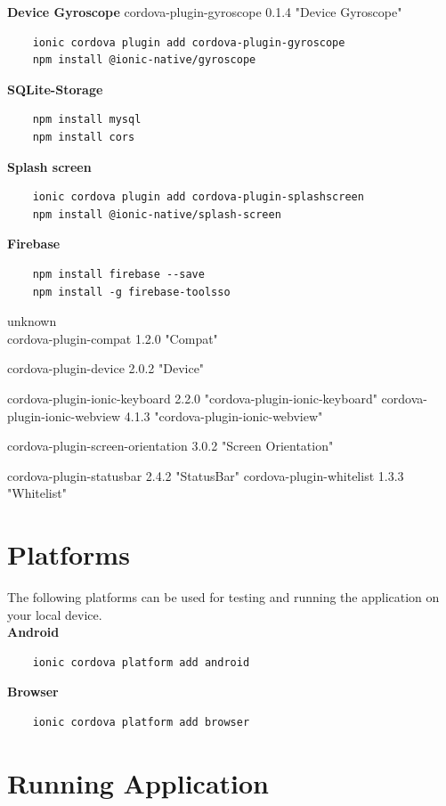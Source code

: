 \documentclass[a4paper,12pt]{report}
\begin{document}
\textbf{Device Gyroscope} cordova-plugin-gyroscope 0.1.4 "Device Gyroscope"
\begin{lstlisting}
    ionic cordova plugin add cordova-plugin-gyroscope
    npm install @ionic-native/gyroscope
\end{lstlisting}


\textbf{SQLite-Storage}
\begin{lstlisting}
    npm install mysql
    npm install cors
\end{lstlisting}


\textbf{Splash screen}
\begin{lstlisting}
    ionic cordova plugin add cordova-plugin-splashscreen
    npm install @ionic-native/splash-screen
\end{lstlisting}{}


\textbf{Firebase}   
\begin{lstlisting}
    npm install firebase --save
    npm install -g firebase-toolsso
\end{lstlisting}





unknown\\
cordova-plugin-compat 1.2.0 "Compat"

cordova-plugin-device 2.0.2 "Device"

cordova-plugin-ionic-keyboard 2.2.0 "cordova-plugin-ionic-keyboard"
cordova-plugin-ionic-webview 4.1.3 "cordova-plugin-ionic-webview"

cordova-plugin-screen-orientation 3.0.2 "Screen Orientation"

cordova-plugin-statusbar 2.4.2 "StatusBar"
cordova-plugin-whitelist 1.3.3 "Whitelist"

\section{Platforms}
The following platforms can be used for testing and running the application on your local device.\\
\textbf{Android}   
\begin{lstlisting}
    ionic cordova platform add android
\end{lstlisting}

\textbf{Browser}   
\begin{lstlisting}
    ionic cordova platform add browser
\end{lstlisting}

\section{Running Application}
\end{document}
